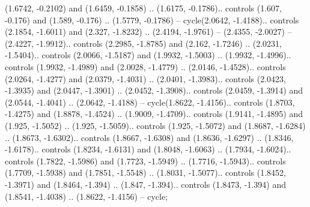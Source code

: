 {(1.6742, -0.2102) and (1.6459, -0.1858) .. (1.6175, -0.1786).. controls (1.607, -0.176) and (1.589, -0.176) .. (1.5779, -0.1786) -- cycle(2.0642, -1.4188).. controls (2.1854, -1.6011) and (2.327, -1.8232) .. (2.4194, -1.9761) -- (2.4355, -2.0027) -- (2.4227, -1.9912).. controls (2.2985, -1.8785) and (2.162, -1.7246) .. (2.0231, -1.5404).. controls (2.0066, -1.5187) and (1.9932, -1.5003) .. (1.9932, -1.4996).. controls (1.9932, -1.4989) and (2.0028, -1.4779) .. (2.0146, -1.4528).. controls (2.0264, -1.4277) and (2.0379, -1.4031) .. (2.0401, -1.3983).. controls (2.0423, -1.3935) and (2.0447, -1.3901) .. (2.0452, -1.3908).. controls (2.0459, -1.3914) and (2.0544, -1.4041) .. (2.0642, -1.4188) -- cycle(1.8622, -1.4156).. controls (1.8703, -1.4275) and (1.8878, -1.4524) .. (1.9009, -1.4709).. controls (1.9141, -1.4895) and (1.925, -1.5052) .. (1.925, -1.5059).. controls (1.925, -1.5072) and (1.8687, -1.6284) .. (1.8673, -1.6302).. controls (1.8667, -1.6308) and (1.8636, -1.6297) .. (1.8346, -1.6178).. controls (1.8234, -1.6131) and (1.8048, -1.6063) .. (1.7934, -1.6024).. controls (1.7822, -1.5986) and (1.7723, -1.5949) .. (1.7716, -1.5943).. controls (1.7709, -1.5938) and (1.7851, -1.5548) .. (1.8031, -1.5077).. controls (1.8452, -1.3971) and (1.8464, -1.394) .. (1.847, -1.394).. controls (1.8473, -1.394) and (1.8541, -1.4038) .. (1.8622, -1.4156) -- cycle;

}